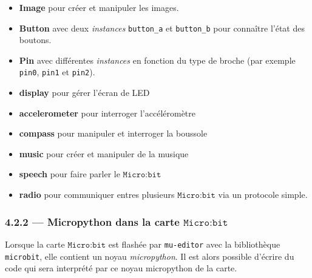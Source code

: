 \documentclass[a4paper,17pt]{extarticle}
\providecommand{\tightlist}{%
      \setlength{\itemsep}{0pt}\setlength{\parskip}{0pt}}
\begin{document}
\begin{itemize}
\tightlist
\item
  \textbf{Image} pour créer et manipuler les images.
\item
  \textbf{Button} avec deux \emph{instances} \texttt{button\_a} et
  \texttt{button\_b} pour connaître l'état des boutons.
\item
  \textbf{Pin} avec différentes \emph{instances} en fonction du type de
  broche (par exemple \texttt{pin0}, \texttt{pin1} et \texttt{pin2}).
\item
  \textbf{display} pour gérer l'écran de LED
\item
  \textbf{accelerometer} pour interroger l'accéléromètre
\item
  \textbf{compass} pour manipuler et interroger la boussole
\item
  \textbf{music} pour créer et manipuler de la musique
\item
  \textbf{speech} pour faire parler le \(\texttt{Micro:bit}\)
\item
  \textbf{radio} pour communiquer entres plusieurs
  \(\texttt{Micro:bit}\) via un protocole simple.
\end{itemize}

    \hypertarget{micropython-dans-la-carte-textttmicrobit}{%
\subsubsection{\texorpdfstring{4.2.2 --- Micropython dans la carte
\(\texttt{Micro:bit}\)}{4.2.2 --- Micropython dans la carte \textbackslash texttt\{Micro:bit\}}}\label{micropython-dans-la-carte-textttmicrobit}}

    Lorsque la carte \(\texttt{Micro:bit}\) est flashée par
\texttt{mu-editor} avec la bibliothèque \texttt{microbit}, elle contient
un noyau \emph{micropython}. Il est alors possible d'écrire du code qui
sera interprété par ce noyau micropython de la carte.
\end{document}
